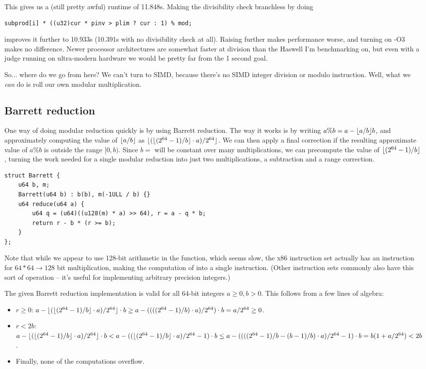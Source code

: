 This gives us a (still pretty awful) runtime of 11.848s.
Making the divisibility check branchless by doing
\begin{lstlisting}
subprod[i] * ((u32)cur * pinv > plim ? cur : 1) % mod;
\end{lstlisting}
improves it further to 10.933s (10.391s with no divisibility check at all).
Raising \verb@PAR@ further makes performance worse, and turning on -O3 makes no difference.
Newer processor architectures are somewhat faster at division than the Haswell I'm benchmarking on, but even with a judge running on ultra-modern hardware we would be pretty far from the 1 second goal.

So... where do we go from here?
We can't turn to SIMD, because there's no SIMD integer division or modulo instruction.
Well, what we \emph{can} do is roll our own modular multiplication.

\subsection{Barrett reduction}
One way of doing modular reduction quickly is by using Barrett reduction.
The way it works is by writing $a \% b = a - \lfloor a / b\rfloor b$, and approximately computing the value of $\lfloor a / b\rfloor$ as $\lfloor(\lfloor(2^{64} - 1) / b\rfloor \cdot a) / 2^{64}\rfloor$.
We can then apply a final correction if the resulting approximate value of $a \% b$ is outside the range $[0, b)$.
Since $b =$ \verb@mod@ will be constant over many multiplications, we can precompute the value of $\lfloor(2^{64} - 1) / b\rfloor$, turning the work needed for a single modular reduction into just two multiplications, a subtraction and a range correction.
\begin{lstlisting}
struct Barrett {
	u64 b, m;
	Barrett(u64 b) : b(b), m(-1ULL / b) {}
	u64 reduce(u64 a) {
		u64 q = (u64)((u128(m) * a) >> 64), r = a - q * b;
		return r - b * (r >= b);
	}
};
\end{lstlisting}

Note that while we appear to use 128-bit arithmetic in the \verb@reduce@ function, which seems slow, the x86 instruction set actually has an instruction for \mbox{$64*64\rightarrow128$} bit multiplication, making the computation of \verb@q@ into a single instruction.
(Other instruction sets commonly also have this sort of operation -- it's useful for implementing arbitrary precision integers.)

The given Barrett reduction implementation is valid for all 64-bit integers $a \ge 0, b > 0$. This follows from a few lines of algebra:
\begin{itemize}
\item $r \ge 0$: $a - \lfloor(\lfloor (2^{64} - 1) / b\rfloor \cdot a)/2^{64}\rfloor \cdot b \ge a - ((((2^{64} - 1) / b) \cdot a)/2^{64}) \cdot b = a / 2^{64} \ge 0$.
\item $r < 2b$: $a - \lfloor(\lfloor (2^{64} - 1) / b\rfloor \cdot a)/2^{64}\rfloor \cdot b < a - ((\lfloor (2^{64} - 1) / b\rfloor \cdot a)/2^{64} - 1) \cdot b \le a - ((((2^{64} - 1) / b - (b - 1) / b) \cdot a)/2^{64} - 1) \cdot b = b (1 + a/2^{64}) < 2b$.
\item Finally, none of the computations overflow.
\end{itemize}

